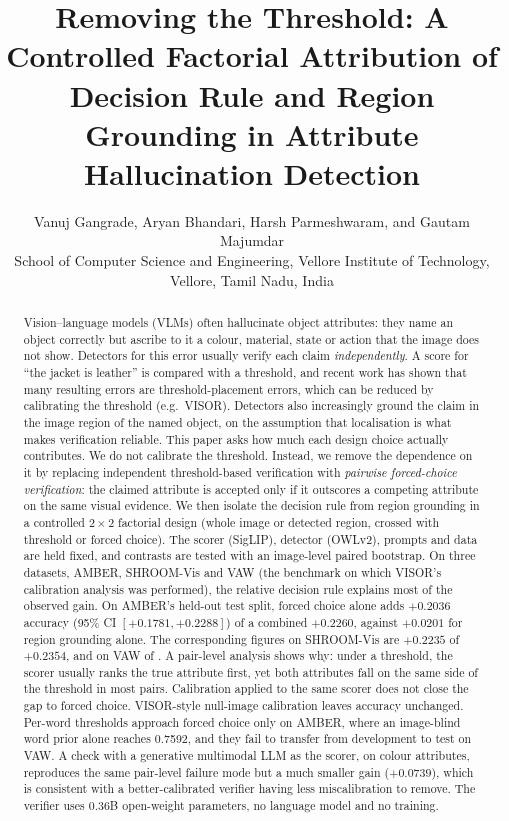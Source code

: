\documentclass[11pt]{article}
\title{\textbf{Removing the Threshold: A Controlled Factorial Attribution of Decision Rule and Region Grounding in Attribute Hallucination Detection}}
\author{Vanuj Gangrade, Aryan Bhandari, Harsh Parmeshwaram, and Gautam Majumdar\\[6pt]
\normalsize School of Computer Science and Engineering, Vellore Institute of Technology,\\
\normalsize Vellore, Tamil Nadu, India}
\date{}
\begin{document}
\maketitle

\begin{abstract}
Vision--language models (VLMs) often hallucinate object attributes: they name an object correctly but ascribe to it a colour, material, state or action that the image does not show. Detectors for this error usually verify each claim \emph{independently}. A score for ``the jacket is leather'' is compared with a threshold, and recent work has shown that many resulting errors are threshold-placement errors, which can be reduced by calibrating the threshold (e.g.\ VISOR). Detectors also increasingly ground the claim in the image region of the named object, on the assumption that localisation is what makes verification reliable. This paper asks how much each design choice actually contributes. We do not calibrate the threshold. Instead, we remove the dependence on it by replacing independent threshold-based verification with \emph{pairwise forced-choice verification}: the claimed attribute is accepted only if it outscores a competing attribute on the same visual evidence. We then isolate the decision rule from region grounding in a controlled $2\times2$ factorial design (whole image or detected region, crossed with threshold or forced choice). The scorer (SigLIP), detector (OWLv2), prompts and data are held fixed, and contrasts are tested with an image-level paired bootstrap. On three datasets, AMBER, SHROOM-Vis and VAW (the benchmark on which VISOR's calibration analysis was performed), the relative decision rule explains most of the observed gain. On AMBER's held-out test split, forced choice alone adds $+0.2036$ accuracy (95\% CI $[+0.1781,+0.2288]$) of a combined $+0.2260$, against $+0.0201$ for region grounding alone. The corresponding figures on SHROOM-Vis are $+0.2235$ of $+0.2354$, and on VAW \VAWtestBminusA{} of \VAWtestDminusA{}. A pair-level analysis shows why: under a threshold, the scorer usually ranks the true attribute first, yet both attributes fall on the same side of the threshold in most pairs. Calibration applied to the same scorer does not close the gap to forced choice. VISOR-style null-image calibration leaves accuracy unchanged. Per-word thresholds approach forced choice only on AMBER, where an image-blind word prior alone reaches 0.7592, and they fail to transfer from development to test on VAW. A check with a generative multimodal LLM as the scorer, on colour attributes, reproduces the same pair-level failure mode but a much smaller gain ($+0.0739$), which is consistent with a better-calibrated verifier having less miscalibration to remove. The verifier uses 0.36B open-weight parameters, no language model and no training.
\end{abstract}
\end{document}
